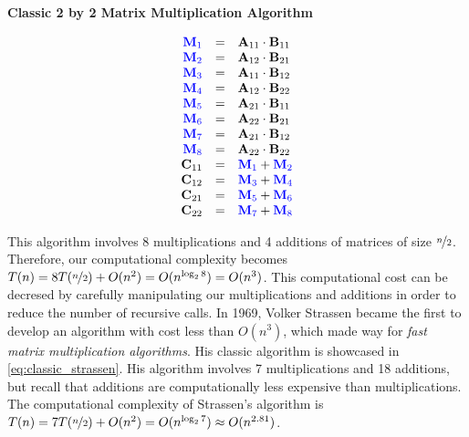     \begin{center}
        \textbf{Classic 2 by 2 Matrix Multiplication Algorithm}
        \vspace{-20pt}
    \end{center}
    \begin{equation}
        \begin{array}{rcl}
            \color{blue} \mathbf{M}_1 & = & \mathbf{A}_{11}\cdot \mathbf{B}_{11} \\
            \color{blue} \mathbf{M}_2 & = & \mathbf{A}_{12}\cdot \mathbf{B}_{21} \\
            \color{blue} \mathbf{M}_3 & = & \mathbf{A}_{11}\cdot \mathbf{B}_{12} \\
            \color{blue} \mathbf{M}_4 & = & \mathbf{A}_{12}\cdot \mathbf{B}_{22} \\
            \color{blue} \mathbf{M}_5 & = & \mathbf{A}_{21}\cdot \mathbf{B}_{11} \\
            \color{blue} \mathbf{M}_6 & = & \mathbf{A}_{22}\cdot \mathbf{B}_{21} \\
            \color{blue} \mathbf{M}_7 & = & \mathbf{A}_{21}\cdot \mathbf{B}_{12} \\
            \color{blue} \mathbf{M}_8 & = & \mathbf{A}_{22}\cdot \mathbf{B}_{22} \\
            \mathbf{C}_{11} & = & \color{blue} \mathbf{M}_1 \color{black} + \color{blue} \mathbf{M}_2 \\
            \mathbf{C}_{12} & = & \color{blue} \mathbf{M}_3 \color{black} + \color{blue} \mathbf{M}_4 \\
            \mathbf{C}_{21} & = & \color{blue} \mathbf{M}_5 \color{black} + \color{blue} \mathbf{M}_6 \\
            \mathbf{C}_{22} & = & \color{blue} \mathbf{M}_7 \color{black} + \color{blue} \mathbf{M}_8
        \end{array}
        \label{eq:classic_matmul}
    \end{equation}


    This algorithm involves 8 multiplications and 4 additions of matrices of size
    $\nicefrac n2$. Therefore, our computational complexity becomes $T(n) =
    8T(\nicefrac{n}{2}) + O(n^2) = O(n^{\log_2 8}) = O(n^3)$. This computational
    cost can be decresed by carefully manipulating our multiplications and additions
    in order to reduce the number of recursive calls. In 1969, Volker Strassen
    became the first to develop an algorithm with cost less than $O(n^3)$, which
    made way for \textit{fast matrix multiplication algorithms}. His classic
    algorithm is showcased in \ref{eq:classic_strassen}. His algorithm involves 7
    multiplications and 18 additions, but recall that additions are computationally
    less expensive than multiplications. The computational complexity of Strassen's
    algorithm is $T(n) = 7T(\nicefrac n2) + O(n^2) = O(n^{\log_2 7}) \approx O(n^{2.81})$. 

